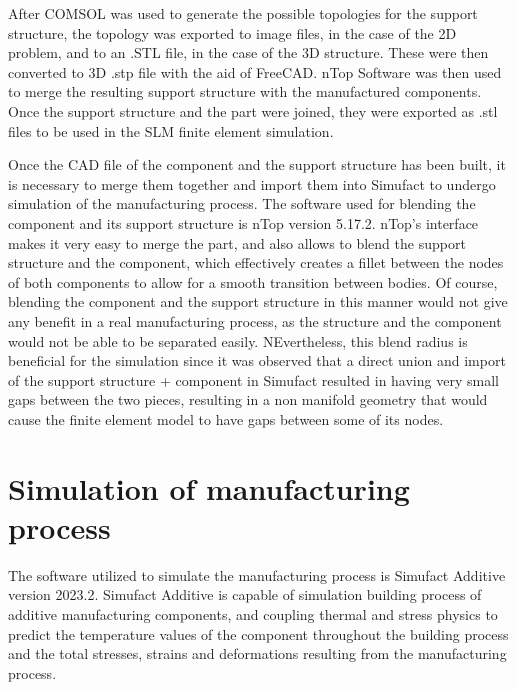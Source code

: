 \documentclass[../main.tex]{subfiles}
\begin{document}
After COMSOL was used to generate the possible topologies for the support structure, the topology was exported to image files, in the case of the 2D problem, and to an .STL file, in the case of the 3D structure. These were then converted to 3D .stp file with the aid of FreeCAD. nTop Software was then used to merge the resulting support structure with the manufactured components. Once the support structure and the part were joined, they were exported as .stl files to be used in the SLM finite element simulation.

Once the CAD file of the component and the support structure has been built, it is necessary to merge them together and import them into Simufact to undergo simulation of the manufacturing process. The software used for blending the component and its support structure is nTop version 5.17.2. nTop's interface makes it very easy to merge the part, and also allows to blend the support structure and the component, which effectively creates a fillet between the nodes of both components to allow for a smooth transition between bodies. Of course, blending the component and the support structure in this manner would not give any benefit in a real manufacturing process, as the structure and the component would not be able to be separated easily. NEvertheless, this blend radius is beneficial for the simulation since it was observed that a direct union and import of the support structure + component in Simufact resulted in having very small gaps between the two pieces, resulting in a non manifold geometry that would cause the finite element model to have gaps between some of its nodes. 


\section{Simulation of manufacturing process}

The software utilized to simulate the manufacturing process is Simufact Additive version 2023.2. Simufact Additive is capable of simulation building process of additive manufacturing components, and coupling thermal and stress physics to predict the temperature values of the component throughout the building process and the total stresses, strains and deformations resulting from the manufacturing process. 

\end{document}
